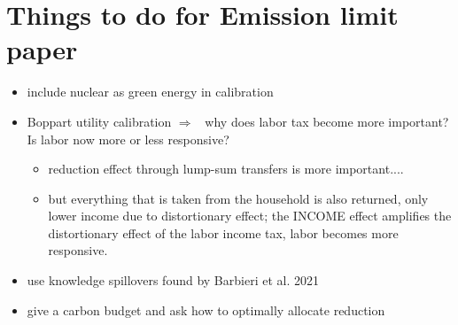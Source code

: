 \documentclass[11pt]{article}
\title{}
\date{}
\newcommand{\ar}{$\Rightarrow$ \ }
\begin{document}
	\section*{Things to do for Emission limit paper}
	\begin{itemize}
		\item include nuclear as green energy in calibration
		\item Boppart utility calibration \ar why does labor tax become more important? Is labor now more or less responsive?
		\begin{itemize}
			\item reduction effect through lump-sum transfers is more important....
			\item but everything that is taken from the household is also returned, only lower income due to distortionary effect; the INCOME effect amplifies the distortionary effect of the labor income tax, labor becomes more responsive. 
		\end{itemize}
		\item use knowledge spillovers found by Barbieri et al. 2021
		\item give a carbon budget and ask how to optimally allocate reduction 
	\end{itemize}
	
	
%	
\end{document}
